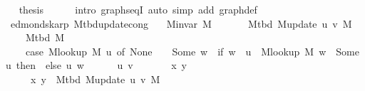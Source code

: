 \begin{isabellebody}
\isanewline
\ \ \isamarkupfalse%
\ {\isacharquery}{\kern0pt}thesis\isanewline
\ \ \ \ \isamarkupfalse%
\ {\isacharparenleft}{\kern0pt}intro\ graphs{\isacharunderscore}{\kern0pt}eqI{\isacharparenright}{\kern0pt}\ {\isacharparenleft}{\kern0pt}auto\ simp\ add{\isacharcolon}{\kern0pt}\ graph{\isacharunderscore}{\kern0pt}def{\isacharparenright}{\kern0pt}\isanewline
{}\isamarkupfalse%
%
\endisatagproof
{\isafoldproof}%
%
\isadelimproof
\isanewline
%
\endisadelimproof
%
\isadeliminvisible
\isanewline
%
\endisadeliminvisible
%
\isataginvisible
{}\isamarkupfalse%
\ {\isacharparenleft}{\kern0pt}\ edmonds{\isacharunderscore}{\kern0pt}karp{\isacharparenright}{\kern0pt}\ M{\isacharunderscore}{\kern0pt}tbd{\isacharunderscore}{\kern0pt}update{\isacharunderscore}{\kern0pt}cong{\isacharcolon}{\kern0pt}\isanewline
\ \ \ {\isachardoublequoteopen}M{\isachardot}{\kern0pt}invar\ M{\isachardoublequoteclose}\isanewline
\ \ \isanewline
\ \ \ \ {\isachardoublequoteopen}M{\isacharunderscore}{\kern0pt}tbd\ {\isacharparenleft}{\kern0pt}M{\isacharunderscore}{\kern0pt}update\ u\ v\ M{\isacharparenright}{\kern0pt}\ {\isacharequal}{\kern0pt}\isanewline
\ \ \ \ \ M{\isacharunderscore}{\kern0pt}tbd\ M\ {\isacharminus}{\kern0pt}\isanewline
\ \ \ \ \ {\isacharparenleft}{\kern0pt}case\ M{\isacharunderscore}{\kern0pt}lookup\ M\ u\ of\ None\ {\isasymRightarrow}\ {\isacharbraceleft}{\kern0pt}{\isacharbraceright}{\kern0pt}\ {\isacharbar}{\kern0pt}\ Some\ w\ {\isasymRightarrow}\ if\ w\ {\isasymnoteq}\ u\ {\isasymand}\ M{\isacharunderscore}{\kern0pt}lookup\ M\ w\ {\isacharequal}{\kern0pt}\ Some\ u\ then\ {\isacharbraceleft}{\kern0pt}{\isacharbraceright}{\kern0pt}\ else\ {\isacharbraceleft}{\kern0pt}{\isacharbraceleft}{\kern0pt}u{\isacharcomma}{\kern0pt}\ w{\isacharbraceright}{\kern0pt}{\isacharbraceright}{\kern0pt}{\isacharparenright}{\kern0pt}\ {\isasymunion}\isanewline
\ \ \ \ \ {\isacharbraceleft}{\kern0pt}{\isacharbraceleft}{\kern0pt}u{\isacharcomma}{\kern0pt}\ v{\isacharbraceright}{\kern0pt}{\isacharbraceright}{\kern0pt}{\isachardoublequoteclose}%
\endisataginvisible
{\isafoldinvisible}%
%
\isadeliminvisible
\isanewline
%
\endisadeliminvisible
%
\isadelimproof
%
\endisadelimproof
%
\isatagproof
{}\isamarkupfalse%
\ {\isacharminus}{\kern0pt}\isanewline
\ \ \isacommand{{\isacharbraceleft}{\kern0pt}}\isamarkupfalse%
\ \isamarkupfalse%
\ x\ y\isanewline
\ \ \ \ \isamarkupfalse%
\isanewline
\ \ \ \ \ \ {\isachardoublequoteopen}{\isacharbraceleft}{\kern0pt}x{\isacharcomma}{\kern0pt}\ y{\isacharbraceright}{\kern0pt}\ {\isasymin}\ M{\isacharunderscore}{\kern0pt}tbd\ {\isacharparenleft}{\kern0pt}M{\isacharunderscore}{\kern0pt}update\ u\ v\ M{\isacharparenright}{\kern0pt}\ {\isasymlongleftrightarrow}\isanewline

\end{isabellebody}
